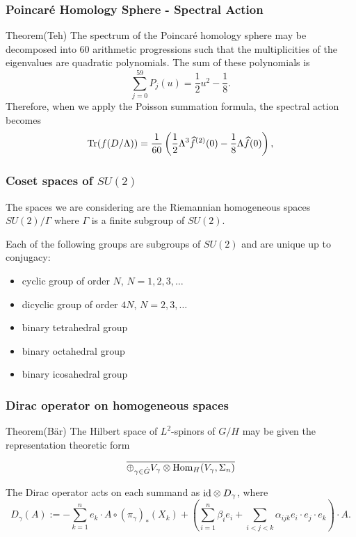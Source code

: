 \documentclass{beamer}
\def\Hom{{\rm Hom}}
\def\id{{\rm id}}
\def\Tr{{\rm Tr}}
\begin{document}
\begin{frame}
\frametitle{Poincar\'e Homology Sphere - Spectral Action}
\begin{block}{Theorem(Teh)}
The spectrum of the Poincar\'e homology sphere may be decomposed into 60 arithmetic progressions such that the multiplicities of the eigenvalues are quadratic polynomials. The sum of these polynomials is
\[
\sum_{j=0}^{59} P_j(u) =  \frac{1}{2}u^2-\frac{1}{8}. 
\]
Therefore, when we apply the Poisson summation formula, the spectral action becomes
\[
\Tr(f(D/\Lambda)) = \frac{1}{60} \left(  \frac{1}{2}\Lambda^3 \widehat f^{(2)}(0) -\frac{1}{8}\Lambda \widehat f(0)  \right),
\]
\end{block}
\end{frame}

\begin{frame}
  \frametitle{Coset spaces of $SU(2)$}
  \begin{block}{}
    The spaces we are considering are the Riemannian homogeneous spaces $SU(2)/\Gamma$ where $\Gamma$ is a finite subgroup of $SU(2)$.

    Each of the following groups are subgroups of $SU(2)$ and are unique up to conjugacy:
    \begin{itemize}
      \item cyclic group of order $N$, $N = 1,2,3,\ldots$
      \item dicyclic group of order $4N$, $N = 2,3,\ldots$
      \item binary tetrahedral group
      \item binary octahedral group
      \item binary icosahedral group
    \end{itemize}
  \end{block}
\end{frame}

\begin{frame}
  \frametitle{Dirac operator on homogeneous spaces}
  \begin{block}{Theorem(B\"ar)}
    The Hilbert space of $L^2$-spinors of $G/H$ may be given the representation theoretic form

    \[
      \overline{\oplus_{\gamma \in \hat{G}} V_{\gamma} \otimes \Hom_{H}(V_{\gamma}, \Sigma_{n})}
    \]
    
    The Dirac operator acts on each summand as $\id \otimes D_{\gamma}$, where
    \[
    D_{\gamma}(A) := - \sum_{k=1}^n e_k \cdot A \circ (\pi_{\gamma})_* (X_k)
+ \left( \sum_{i=1}^n \beta_i e_i + \sum_{i<j<k}\alpha_{ijk}e_i \cdot e_j \cdot e_k \right) \cdot A.
    \]
  \end{block}
\end{frame}
\end{document}
